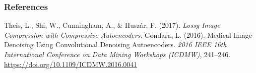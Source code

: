 \begin{vbframe}
\frametitle{References}
\footnotesize{
\begin{thebibliography}{99}
 Theis, L., Shi, W., Cunningham, A., \& Huszár, F. (2017). \textit{Lossy Image Compression with Compressive Autoencoders.}
 Gondara, L. (2016). Medical Image Denoising Using Convolutional Denoising Autoencoders. \textit{2016 IEEE 16th International Conference on Data Mining Workshops (ICDMW)}, 241–246. \url{https://doi.org/10.1109/ICDMW.2016.0041}

\end{thebibliography}
}
\end{vbframe}


\endlecture

